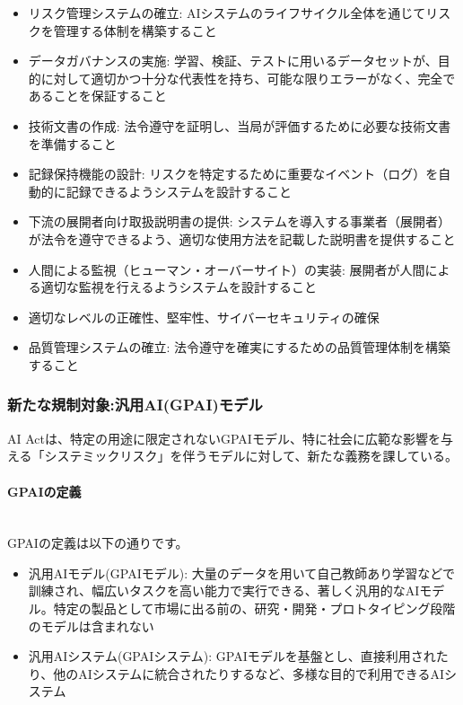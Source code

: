\begin{itemize}
    \item リスク管理システムの確立: AIシステムのライフサイクル全体を通じてリスクを管理する体制を構築すること
    \item データガバナンスの実施: 学習、検証、テストに用いるデータセットが、目的に対して適切かつ十分な代表性を持ち、可能な限りエラーがなく、完全であることを保証すること
    \item 技術文書の作成: 法令遵守を証明し、当局が評価するために必要な技術文書を準備すること
    \item 記録保持機能の設計: リスクを特定するために重要なイベント（ログ）を自動的に記録できるようシステムを設計すること
    \item 下流の展開者向け取扱説明書の提供: システムを導入する事業者（展開者）が法令を遵守できるよう、適切な使用方法を記載した説明書を提供すること
    \item 人間による監視（ヒューマン・オーバーサイト）の実装: 展開者が人間による適切な監視を行えるようシステムを設計すること
    \item 適切なレベルの正確性、堅牢性、サイバーセキュリティの確保
    \item 品質管理システムの確立: 法令遵守を確実にするための品質管理体制を構築すること
\end{itemize}

\subsubsection{新たな規制対象:汎用AI(GPAI)モデル}
AI Actは、特定の用途に限定されないGPAIモデル、特に社会に広範な影響を与える「システミックリスク」を伴うモデルに対して、新たな義務を課している。

\paragraph{GPAIの定義} \\
GPAIの定義は以下の通りです。

\begin{itemize}
    \item 汎用AIモデル(GPAIモデル): 大量のデータを用いて自己教師あり学習などで訓練され、幅広いタスクを高い能力で実行できる、著しく汎用的なAIモデル。特定の製品として市場に出る前の、研究・開発・プロトタイピング段階のモデルは含まれない
    \item 汎用AIシステム(GPAIシステム): GPAIモデルを基盤とし、直接利用されたり、他のAIシステムに統合されたりするなど、多様な目的で利用できるAIシステム
\end{itemize}

